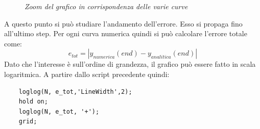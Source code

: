 \begin{figure}[H]
	\centering   
	\caption{\textit{Zoom del grafico in corrispondenza delle varie curve}}
\end{figure}
A questo punto si può studiare l'andamento dell'errore. Esso si propaga fino all'ultimo step. Per ogni curva numerica quindi si può calcolare l'errore totale come:
\begin{equation*}
	e_{tot} = |y_{numerica}(end) - y_{analitica}(end)|
\end{equation*}
Dato che l'interesse è sull'ordine di grandezza, il grafico può essere fatto in scala logaritmica. A partire dallo script precedente quindi:
\begin{verbatim}
	loglog(N, e_tot,'LineWidth',2);
	hold on;
	loglog(N, e_tot, '+');
	grid;
\end{verbatim}
